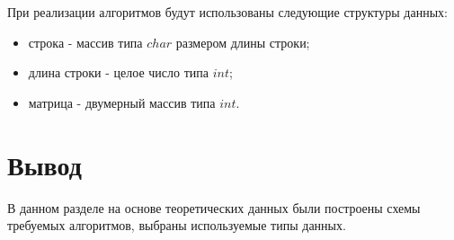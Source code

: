 При реализации алгоритмов будут использованы следующие структуры данных:

\begin{itemize}
	\item строка - массив типа $char$ размером длины строки;
	\item длина строки - целое число типа $int$;
	\item матрица - двумерный массив типа $int$.
\end{itemize}

\section*{Вывод}

В данном разделе на основе теоретических данных были построены схемы
требуемых алгоритмов, выбраны используемые типы данных.